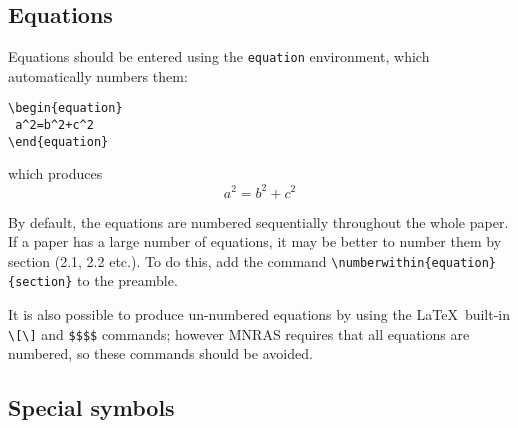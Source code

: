 \documentclass[fleqn,usenatbib,useAMS]{mnras}
\begin{document}
\subsection{Equations}
Equations should be entered using the \verb'equation' environment, which automatically numbers them:

\begin{verbatim}
\begin{equation}
 a^2=b^2+c^2
\end{equation}
\end{verbatim}
\noindent which produces
\begin{equation}
 a^2=b^2+c^2
\end{equation}

By default, the equations are numbered sequentially throughout the whole paper. If a paper has a large number of equations, it may be better to number them by section (2.1, 2.2 etc.). To do this, add the command \verb'\numberwithin{equation}{section}' to the preamble.

It is also possible to produce un-numbered equations by using the \LaTeX\ built-in \verb'\['\textellipsis\verb'\]' and \verb'$$'\textellipsis\verb'$$' commands; however MNRAS requires that all equations are numbered, so these commands should be avoided.

\subsection{Special symbols}
\end{document}
